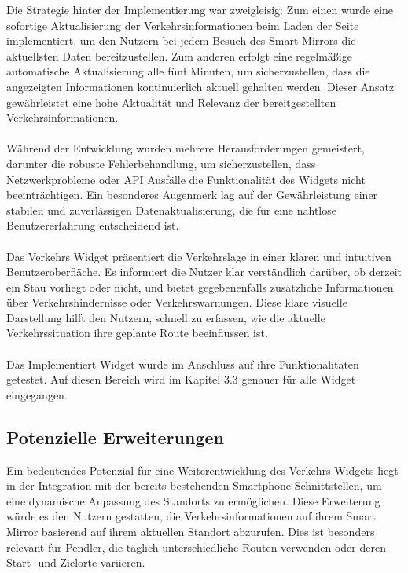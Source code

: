 \noindent
Die Strategie hinter der Implementierung war zweigleisig: Zum einen wurde eine sofortige Aktualisierung der Verkehrsinformationen beim Laden der Seite implementiert, um den Nutzern bei jedem Besuch des Smart Mirrors die aktuellsten Daten bereitzustellen. Zum anderen erfolgt eine regelmäßige automatische Aktualisierung alle fünf Minuten, um sicherzustellen, dass die angezeigten Informationen kontinuierlich aktuell gehalten werden. Dieser Ansatz gewährleistet eine hohe Aktualität und Relevanz der bereitgestellten Verkehrsinformationen. \\ \\
\noindent
Während der Entwicklung wurden mehrere Herausforderungen gemeistert, darunter die robuste Fehlerbehandlung, um sicherzustellen, dass Netzwerkprobleme oder API Ausfälle die Funktionalität des Widgets nicht beeinträchtigen. Ein besonderes Augenmerk lag auf der Gewährleistung einer stabilen und zuverlässigen Datenaktualisierung, die für eine nahtlose Benutzererfahrung entscheidend ist. \\ \\
\noindent
Das Verkehrs Widget präsentiert die Verkehrslage in einer klaren und intuitiven Benutzeroberfläche. Es informiert die Nutzer klar verständlich darüber, ob derzeit ein Stau vorliegt oder nicht, und bietet gegebenenfalls zusätzliche Informationen über Verkehrshindernisse oder Verkehrswarnungen. Diese klare visuelle Darstellung hilft den Nutzern, schnell zu erfassen, wie die aktuelle Verkehrssituation ihre geplante Route beeinflussen ist. \\ \\
\noindent
Das Implementiert Widget wurde im Anschluss auf ihre Funktionalitäten getestet. Auf diesen Bereich wird im Kapitel 3.3 genauer für alle Widget eingegangen.

\subsection*{Potenzielle Erweiterungen}
Ein bedeutendes Potenzial für eine Weiterentwicklung des Verkehrs Widgets liegt in der Integration mit der bereits bestehenden Smartphone Schnittstellen, um eine dynamische Anpassung des Standorts zu ermöglichen. Diese Erweiterung würde es den Nutzern gestatten, die Verkehrsinformationen auf ihrem Smart Mirror basierend auf ihrem aktuellen Standort abzurufen. Dies ist besonders relevant für Pendler, die täglich unterschiedliche Routen verwenden oder deren Start- und Zielorte variieren.


